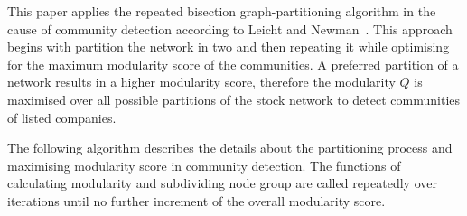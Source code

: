 This paper applies the repeated bisection graph-partitioning algorithm in the cause of community detection according to Leicht and Newman~\cite{PhysRevLett.100.118703}. This approach begins with partition the network in two and then repeating it while optimising for the maximum modularity score of the communities. A preferred partition of a network results in a higher modularity score, therefore the modularity $Q$ is maximised over all possible partitions of the stock network to detect communities of listed companies.

The following algorithm describes the details about the partitioning process and maximising modularity score in community detection. The functions of calculating modularity and subdividing node group are called repeatedly over iterations until no further increment of the overall modularity score.

